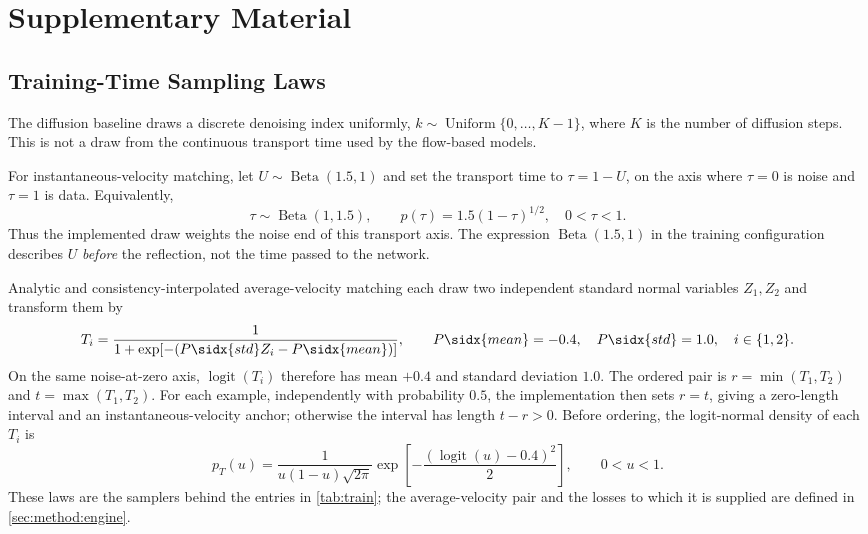 \appendix{}

\chapter{Supplementary Material}\label{app:derivations}\label{app:supplementary}

\section{Training-Time Sampling Laws}\label{app:training-time-laws}

The diffusion baseline draws a discrete denoising index uniformly,
$k\sim\operatorname{Uniform}\{0,\ldots,K-1\}$, where $K$ is the number of diffusion steps. This is not
a draw from the continuous transport time used by the flow-based models.

For instantaneous-velocity matching, let $U\sim\operatorname{Beta}(1.5,1)$ and set the transport
time to $\tau=1-U$, on the axis where $\tau=0$ is noise and $\tau=1$ is data. Equivalently,
\begin{equation}
  \tau\sim\operatorname{Beta}(1,1.5),\qquad
  p(\tau)=1.5(1-\tau)^{1/2},\quad 0<\tau<1.
\end{equation}
Thus the implemented draw weights the noise end of this transport axis. The expression
$\operatorname{Beta}(1.5,1)$ in the training configuration describes $U$ \emph{before} the reflection,
not the time passed to the network.

Analytic and consistency-interpolated average-velocity matching each draw two independent standard
normal variables $Z_1,Z_2$ and transform them by
\begin{equation}
  T_i=\frac{1}{1+\exp[-(P\sidx{std}Z_i-P\sidx{mean})]},\qquad
  P\sidx{mean}=-0.4,\quad P\sidx{std}=1.0,\quad i\in\{1,2\}.
\end{equation}
On the same noise-at-zero axis, $\operatorname{logit}(T_i)$ therefore has mean $+0.4$ and standard
deviation $1.0$. The ordered pair is $r=\min(T_1,T_2)$ and $t=\max(T_1,T_2)$. For each example,
independently with probability $0.5$, the implementation then sets $r=t$, giving a zero-length interval and an
instantaneous-velocity anchor; otherwise the interval has length $t-r>0$. Before ordering, the
logit-normal density of each $T_i$ is
\begin{equation}
  p_T(u)=\frac{1}{u(1-u)\sqrt{2\pi}}
  \exp\!\left[-\frac{(\operatorname{logit}(u)-0.4)^2}{2}\right],\qquad 0<u<1.
\end{equation}
These laws are the samplers behind the entries in \autoref{tab:train}; the average-velocity pair and
the losses to which it is supplied are defined in \autoref{sec:method:engine}.

